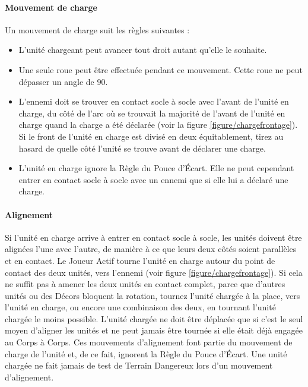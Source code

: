 \paragraph{Mouvement de charge}

Un mouvement de charge suit les règles suivantes :
\begin{itemize}[label={-}]
\item L'unité chargeant peut avancer tout droit autant qu'elle le souhaite.
\item Une seule roue peut être effectuée pendant ce mouvement. Cette roue ne peut dépasser un angle de 90{\text{\degree}}.
\item L'ennemi doit se trouver en contact socle à socle avec l'avant de l'unité en charge, du côté de l'arc où se trouvait la majorité de l'avant de l'unité en charge quand la charge a été déclarée (voir la figure \ref{figure/chargefrontage}). Si le front de l'unité en charge est divisé en deux équitablement, tirez au hasard de quelle côté l'unité se trouve avant de déclarer une charge.
\item L'unité en charge ignore la Règle du Pouce d'Écart. Elle ne peut cependant entrer en contact socle à socle avec un ennemi que si elle lui a déclaré une charge.
\end{itemize}

\paragraph{Alignement}
\label{aligning_units}

Si l'unité en charge arrive à entrer en contact socle à socle, les unités doivent être alignées l'une avec l'autre, de manière à ce que leurs deux côtés soient parallèles et en contact. Le Joueur Actif tourne l'unité en charge autour du point de contact des deux unités, vers l'ennemi (voir figure \ref{figure/chargefrontage}). Si cela ne suffit pas à amener les deux unités en contact complet, parce que d'autres unités ou des Décors bloquent la rotation, tournez l'unité chargée à la place, vers l'unité en charge, ou encore une combinaison des deux, en tournant l'unité chargée le moins possible. L'unité chargée ne doit être déplacée que si c'est le seul moyen d'aligner les unités et ne peut jamais être tournée si elle était déjà engagée au Corps à Corps. Ces mouvements d'alignement font partie du mouvement de charge de l'unité et, de ce fait, ignorent la Règle du Pouce d'Écart. Une unité chargée ne fait jamais de test de Terrain Dangereux lors d'un mouvement d'alignement.

